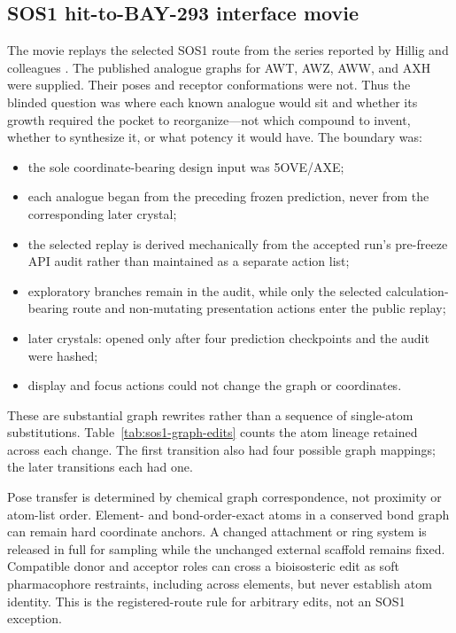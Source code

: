 \subsection{SOS1 hit-to-BAY-293 interface movie}
\label{app:sos1-movie}

The movie replays the selected SOS1 route from the series reported by Hillig
and colleagues \cite{hillig2019bay293}. The published analogue graphs for AWT,
AWZ, AWW, and AXH were supplied. Their poses and receptor conformations were
not. Thus the blinded question was where each known analogue would sit and
whether its growth required the pocket to reorganize---not which compound to
invent, whether to synthesize it, or what potency it would have. The boundary
was:

\begin{itemize}
  \item the sole coordinate-bearing design input was 5OVE/AXE;
  \item each analogue began from the preceding frozen prediction, never from
    the corresponding later crystal;
  \item the selected replay is derived mechanically from the accepted run's
    pre-freeze API audit rather than maintained as a separate action list;
  \item exploratory branches remain in the audit, while only the selected
    calculation-bearing route and non-mutating presentation actions enter the
    public replay;
  \item later crystals: opened only after four prediction checkpoints and the
    audit were hashed;
  \item display and focus actions could not change the graph or coordinates.
\end{itemize}

These are substantial graph rewrites rather than a sequence of single-atom
substitutions. Table~\ref{tab:sos1-graph-edits} counts the atom lineage retained
across each change. The first transition also had four possible graph mappings;
the later transitions each had one.

Pose transfer is determined by chemical graph correspondence, not proximity or
atom-list order. Element- and bond-order-exact atoms in a conserved bond graph
can remain hard coordinate anchors. A changed attachment or ring system is
released in full for sampling while the unchanged external scaffold remains
fixed. Compatible donor and acceptor roles can cross a bioisosteric edit as soft
pharmacophore restraints, including across elements, but never establish atom
identity. This is the registered-route rule for arbitrary edits, not an SOS1
exception.

